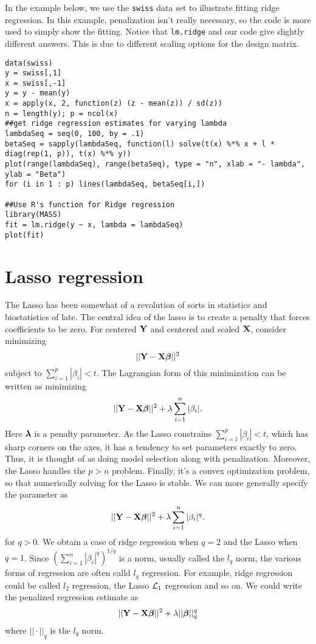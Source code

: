 In the example below, we use the \texttt{swiss} data set to illustrate
fitting ridge regression. In this example, penalization isn't really
necessary, so the code is more used to simply show the fitting.
Notice that \texttt{lm.ridge} and our code give slightly different
answers. This is due to different scaling options for the design matrix.

\begin{verbatim}
data(swiss)
y = swiss[,1]
x = swiss[,-1]
y = y - mean(y)
x = apply(x, 2, function(z) (z - mean(z)) / sd(z))
n = length(y); p = ncol(x)
##get ridge regression estimates for varying lambda
lambdaSeq = seq(0, 100, by = .1)
betaSeq = sapply(lambdaSeq, function(l) solve(t(x) %*% x + l * diag(rep(1, p)), t(x) %*% y))
plot(range(lambdaSeq), range(betaSeq), type = "n", xlab = "- lambda", ylab = "Beta")
for (i in 1 : p) lines(lambdaSeq, betaSeq[i,])

##Use R's function for Ridge regression
library(MASS)
fit = lm.ridge(y ~ x, lambda = lambdaSeq)
plot(fit)

\end{verbatim}


\section{Lasso regression}

The Lasso has been somewhat of a revolution of sorts in statistics and biostatistics
of late. The central idea of the lasso is to create a penalty that forces
coefficients to be zero. For centered $\mathbf{Y}$ and centered and scaled $\mathbf{X}$, 
consider minimizing
$$
|| \mathbf{Y} - \mathbf{X} \boldsymbol{\beta}||^2
$$
subject to $\sum_{i=1}^p | \beta_i| < t$. The Lagrangian form of this minimization
can be written as minimizing
$$
|| \mathbf{Y} - \mathbf{X} \boldsymbol{\beta}||^2 + \lambda \sum_{i=1}^n | \beta_i|.
$$
Here $\boldsymbol{\lambda}$ is a penalty parameter. As the Lasso constrains
$\sum_{i=1}^p | \beta_i| < t$, which has sharp corners on the axes,
it has a tendency to set parameters exactly to zero. Thus, it is 
thought of as doing model selection along with penalization. 
Moreover, the Lasso handles the $p > n$ problem. Finally, it's
a convex optimization problem, so that numerically solving 
for the Lasso is stable. We can more generally specify the parameter
as
$$
|| \mathbf{Y} - \mathbf{X} \boldsymbol{\beta}||^2 + \lambda \sum_{i=1}^n | \beta_i |^q.
$$
for $q > 0$. We obtain a case of ridge regression when $q=2$ and
the Lasso when $q=1$. Since $(\sum_{i=1}^n | \beta_i |^q)^{1/q}$ is a norm,
usually called the $l_q$ norm, the various forms of
regression are often calld $l_q$ regression. For example,
ridge regression could be called $l_2$ regression, the Lasso
${\cal L}_1$ regression and so on. We could write the penalized regression estimate as
$$
|| \mathbf{Y} - \mathbf{X} \boldsymbol{\beta}||^2 + \lambda ||\boldsymbol{\beta}||_q^q
$$
where $||\cdot||_q$ is the $l_q$ norm.


